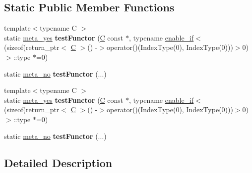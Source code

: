 \subsection*{Static Public Member Functions}
\begin{DoxyCompactItemize}
\item 
\mbox{\label{struct_eigen_1_1internal_1_1has__binary__operator_abf526f2d4d1c2606b3aca2e97cd29143}} 
{\footnotesize template$<$typename C $>$ }\\static \hyperlink{struct_eigen_1_1internal_1_1meta__yes}{meta\+\_\+yes} {\bfseries test\+Functor} (\hyperlink{group___core___module}{C} const $\ast$, typename \hyperlink{struct_eigen_1_1internal_1_1enable__if}{enable\+\_\+if}$<$(sizeof(return\+\_\+ptr$<$ \hyperlink{group___core___module}{C} $>$() -\/$>$operator()(Index\+Type(0), Index\+Type(0)))$>$0)$>$\+::type $\ast$=0)
\item 
\mbox{\label{struct_eigen_1_1internal_1_1has__binary__operator_a7c0f24b7478b7c0f456ae7f8bd9da4a3}} 
static \hyperlink{struct_eigen_1_1internal_1_1meta__no}{meta\+\_\+no} {\bfseries test\+Functor} (...)
\item 
\mbox{\label{struct_eigen_1_1internal_1_1has__binary__operator_abf526f2d4d1c2606b3aca2e97cd29143}} 
{\footnotesize template$<$typename C $>$ }\\static \hyperlink{struct_eigen_1_1internal_1_1meta__yes}{meta\+\_\+yes} {\bfseries test\+Functor} (\hyperlink{group___core___module}{C} const $\ast$, typename \hyperlink{struct_eigen_1_1internal_1_1enable__if}{enable\+\_\+if}$<$(sizeof(return\+\_\+ptr$<$ \hyperlink{group___core___module}{C} $>$() -\/$>$operator()(Index\+Type(0), Index\+Type(0)))$>$0)$>$\+::type $\ast$=0)
\item 
\mbox{\label{struct_eigen_1_1internal_1_1has__binary__operator_a7c0f24b7478b7c0f456ae7f8bd9da4a3}} 
static \hyperlink{struct_eigen_1_1internal_1_1meta__no}{meta\+\_\+no} {\bfseries test\+Functor} (...)
\end{DoxyCompactItemize}


\subsection{Detailed Description}
